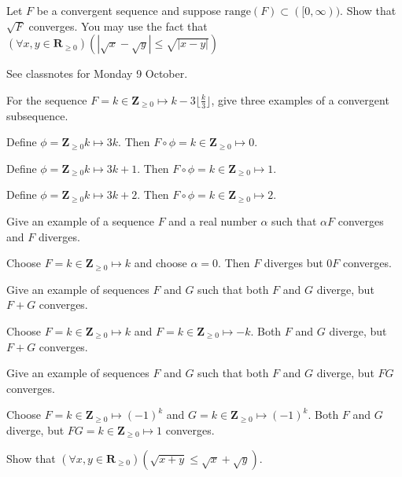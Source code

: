 \documentclass[12pt, fleqn]{exam}
\newcommand{\reals}{\mathbf{R}}
\newcommand{\integers}{\mathbf{Z}}
\newcommand{\range}{\mathrm{range}}
\begin{document}
\begin{questions}
\begin{solution}
\end{solution}

\question Let $F$ be a convergent sequence and suppose $\range(F) \subset([0,\infty))$. Show that $\sqrt{F}$ converges.
You may use the fact that $\left(\forall x,y \in \reals_{\geq 0}\right)  (| \sqrt{x} - \sqrt{y} | \leq \sqrt{|x - y|} )$

\begin{solution}
See classnotes for Monday 9 October.
\end{solution}

\question For the sequence $F  = k \in \integers_{\geq 0} \mapsto k - 3 \lfloor \frac{k}{3} \rfloor $, give three examples of
a convergent subsequence.

\begin{solution}  Define $\phi = \integers_{\geq 0} k \mapsto  3 k$.
  Then $F \circ \phi = k \in \integers_{\geq 0} \mapsto 0$.

  Define $\phi = \integers_{\geq 0} k \mapsto  3 k + 1$.
  Then $F \circ \phi = k \in \integers_{\geq 0} \mapsto 1$.

  Define $\phi = \integers_{\geq 0} k \mapsto  3 k + 2$.
  Then $F \circ \phi = k \in \integers_{\geq 0} \mapsto 2$.

  
\end{solution}

\question Give an example of a sequence $F$ and a real number $\alpha$ such that $\alpha F$ converges and $F$ diverges.
\begin{solution} Choose $F = k \in \integers_{\geq 0} \mapsto k$ and choose $\alpha = 0$. Then $F$ diverges but $0F$ 
converges.
\end{solution}
 \question Give an example of sequences $F$ and $G$ such that both $F$ and $G$ diverge, but $F+ G$ converges.
 \begin{solution} Choose $F = k \in \integers_{\geq 0} \mapsto k$ and $F = k \in \integers_{\geq 0} \mapsto -k$.
 Both $F$ and $G$ diverge, but $F+G$ converges.
 \end{solution}
 
  \question Give an example of sequences $F$ and $G$ such that both $F$ and $G$ diverge, but $F G$ converges.
 \begin{solution} Choose $F = k \in \integers_{\geq 0} \mapsto (-1)^k$ and $G = k \in \integers_{\geq 0} \mapsto (-1)^k$.
 Both $F$ and $G$ diverge, but $F G =  k \in \integers_{\geq 0} \mapsto 1$ converges.
 \end{solution}
\question Show that $\left(\forall x,y \in \reals_{\geq 0}\right)(\sqrt{x+y} \leq \sqrt{x} +\sqrt{y})$.


\end{questions}
\end{document}
